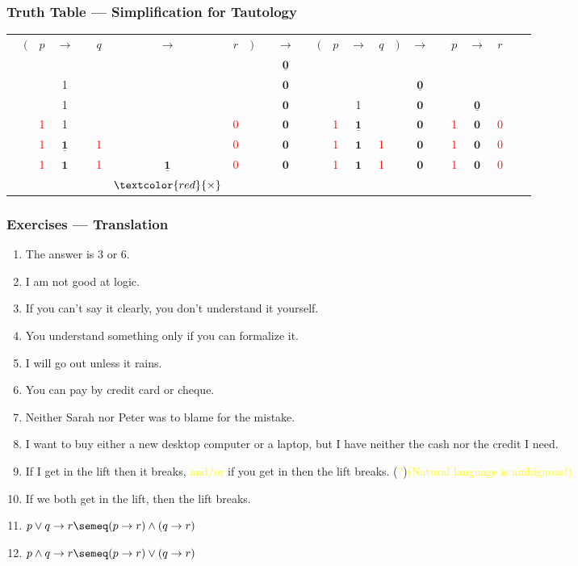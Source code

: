 \documentclass[UTF8,11pt,colorlinks,compress,openany]{beamer}%
\begin{document}
\begin{frame}\frametitle{Truth Table --- Simplification for Tautology}
	\begin{table}\huge
		\tabcolsep=2pt
		\begin{tabu}{*{24}c}
			&$($&$p$&$\to$&&$q$&$\to$ &$r$&$)$&&$\to$ &&$($&$p$&$\to$ &$q$&$)$&$\to$&&$p$&$\to$ &$r$&&\\
			&&&&&&&&&&$\underline{\mathbf{0}}$&&&&&&&&&&&&&\\
			&&&1&&&&&&&$\mathbf{0}$&&&&&&&$\underline{\mathbf{0}}$&&&&&&\\
			&&&1&&&&&&&$\mathbf{0}$&&&&1&&&$\mathbf{0}$&&&$\underline{\mathbf{0}}$&&&\\
			&&\textcolor{red}{1}&1&&&&\textcolor{red}{0}&&&$\mathbf{0}$&&&\textcolor{red}{1}&$\underline{\mathbf{1}}$&&&$\mathbf{0}$&&\textcolor{red}{1}&$\mathbf{0}$&\textcolor{red}{0}&&\\
			&&\textcolor{red}{1}&$\underline{\mathbf{1}}$&&\textcolor{red}{1}&&\textcolor{red}{0}&&&$\mathbf{0}$&&&\textcolor{red}{1}&$\mathbf{1}$&\textcolor{red}{1}&&$\mathbf{0}$&&\textcolor{red}{1}&$\mathbf{0}$&\textcolor{red}{0}&&\\
			&&\textcolor{red}{1}&$\mathbf{1}$&&\textcolor{red}{1}&$\underline{\mathbf{1}}$&\textcolor{red}{0}&&&$\mathbf{0}$&&&\textcolor{red}{1}&$\mathbf{1}$&\textcolor{red}{1}&&$\mathbf{0}$&&\textcolor{red}{1}&$\mathbf{0}$&\textcolor{red}{0}&&\\
			&&&&&&$\textcolor{red}{\times}$&&&&&&&&&&&&&&&&&
		\end{tabu}
	\end{table}
\end{frame}

\begin{frame}\frametitle{Exercises --- Translation}
		\begin{enumerate}
			\item The answer is $3$ or $6$.
			\item I am not good at logic.
			\item If you can't say it clearly, you don't understand it yourself.
			\item You understand something only if you can formalize it.
			\item I will go out unless it rains.
			\item You can pay by credit card or cheque.
			\item Neither Sarah nor Peter was to blame for the mistake.
			\item I want to buy either a new desktop computer or a laptop, but I have neither the cash nor the credit I need.
			\item If I get in the lift then it breaks, \textcolor{yellow}{and/or} if you get in then the lift breaks. (\textcolor{yellow}{?})\hfill \textcolor{yellow}{(Natural language is ambiguous!)}
			\item If we both get in the lift, then the lift breaks.
			\item $p\vee q\to r\semeq(p\to r)\wedge(q\to r)$
			\item $p\wedge q\to r\semeq(p\to r)\vee(q\to r)$
		\end{enumerate}
\end{frame}
\end{document}
